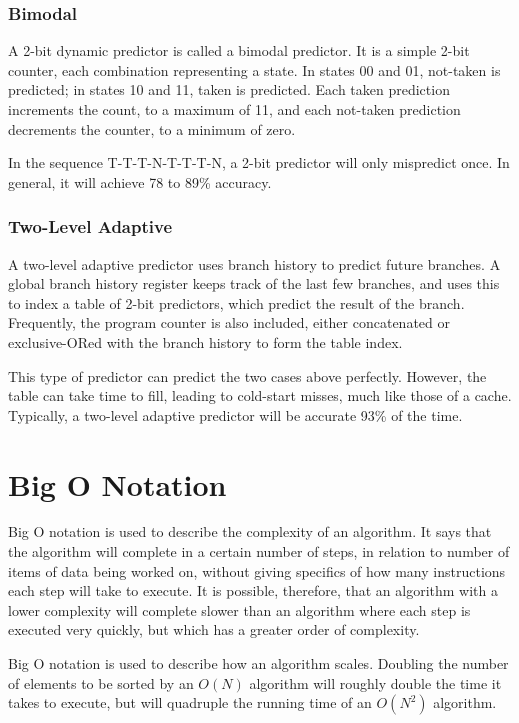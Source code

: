 \subsubsection{Bimodal}
A 2-bit dynamic predictor is called a bimodal predictor. It is a simple 2-bit
counter, each combination representing a state. In states 00 and 01, not-taken
is predicted; in states 10 and 11, taken is predicted. Each taken prediction
increments the count, to a maximum of 11, and each not-taken prediction
decrements the counter, to a minimum of zero.

In the sequence T-T-T-N-T-T-T-N, a 2-bit predictor will only mispredict once.
In general, it will achieve 78 to 89\% accuracy.

\subsubsection{Two-Level Adaptive}
A two-level adaptive predictor uses branch history to predict future branches. A
global branch history register keeps track of the last few branches, and uses
this to index a table of 2-bit predictors, which predict the result of the
branch. Frequently, the program counter is also included, either concatenated or
exclusive-ORed with the branch history to form the table index.

This type of predictor can predict the two cases above perfectly.  However, the
table can take time to fill, leading to cold-start misses, much like those of a
cache. Typically, a two-level adaptive predictor will be accurate 93\% of the time.

\section{Big O Notation}
Big O notation is used to describe the complexity of an algorithm. It says that
the algorithm will complete in a certain number of steps, in relation to number
of items of data being worked on, without giving specifics of how many
instructions each step will take to execute. It is possible, therefore, that an
algorithm with a lower complexity will complete slower than an algorithm where
each step is executed very quickly, but which has a greater order of complexity.

Big O notation is used to describe how an algorithm scales. Doubling the number
of elements to be sorted by an $O(N)$ algorithm will roughly double the time it
takes to execute, but will quadruple the running time of an $O(N^2)$ algorithm.

